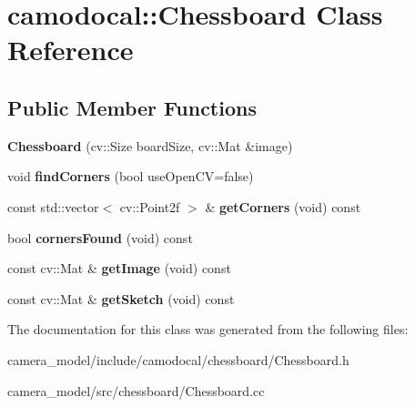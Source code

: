 \hypertarget{classcamodocal_1_1Chessboard}{}\section{camodocal\+:\+:Chessboard Class Reference}
\label{classcamodocal_1_1Chessboard}
\subsection*{Public Member Functions}
\begin{DoxyCompactItemize}
\item 
\mbox{\label{classcamodocal_1_1Chessboard_ad78c50ec12b5add1690415d36085d7f3}} 
{\bfseries Chessboard} (cv\+::\+Size board\+Size, cv\+::\+Mat \&image)
\item 
\mbox{\label{classcamodocal_1_1Chessboard_afaf550f0cd4114c43fbd8d06fa5fcbba}} 
void {\bfseries find\+Corners} (bool use\+Open\+CV=false)
\item 
\mbox{\label{classcamodocal_1_1Chessboard_a67d30c45147a8b5425a7295aafac4e67}} 
const std\+::vector$<$ cv\+::\+Point2f $>$ \& {\bfseries get\+Corners} (void) const
\item 
\mbox{\label{classcamodocal_1_1Chessboard_a849f42f290405858b43b84317769a9e2}} 
bool {\bfseries corners\+Found} (void) const
\item 
\mbox{\label{classcamodocal_1_1Chessboard_a07f0d320f0855d03167e992fa49eb6ec}} 
const cv\+::\+Mat \& {\bfseries get\+Image} (void) const
\item 
\mbox{\label{classcamodocal_1_1Chessboard_a182cc0e7fb1b96336d92cbc6bf626b98}} 
const cv\+::\+Mat \& {\bfseries get\+Sketch} (void) const
\end{DoxyCompactItemize}


The documentation for this class was generated from the following files\+:\begin{DoxyCompactItemize}
\item 
camera\+\_\+model/include/camodocal/chessboard/Chessboard.\+h\item 
camera\+\_\+model/src/chessboard/Chessboard.\+cc\end{DoxyCompactItemize}
